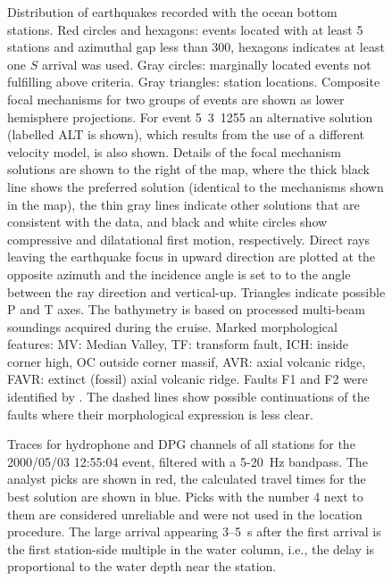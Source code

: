 \documentclass[jgr]{aguplus}
\newlength{\tw}
\begin{document}
\clearpage

\begin{figure}

\caption{Distribution of earthquakes recorded with the ocean bottom
stations.  Red circles and hexagons: events located with at least 5 stations and
azimuthal gap less than 300\dg, hexagons indicates at least one $S$
arrival was used. Gray circles: marginally located events not fulfilling above
criteria. Gray triangles: station locations.  Composite focal mechanisms for two
groups of events are shown as lower hemisphere projections.
  For
event 5~3~1255 an alternative solution (labelled ALT is shown), which results from
the use of a different velocity model, is also shown.  Details of the focal
mechanism solutions are shown to the right of the map, where the thick
black line shows the preferred solution (identical to the
mechanisms shown in the map), the thin gray lines indicate other
solutions that are consistent with the data, and black and white circles show
compressive and dilatational first motion, respectively. Direct rays
leaving the earthquake focus in upward direction are plotted at the
opposite azimuth and the incidence angle is set to to the angle
between the ray direction and vertical-up.  Triangles indicate possible P and T axes.  The bathymetry is
based on processed multi-beam soundings acquired during the cruise.
Marked morphological features: MV: Median Valley, TF: transform fault,
ICH: inside corner high, OC outside corner massif, AVR: axial volcanic
ridge, FAVR: extinct (fossil) axial volcanic ridge. Faults F1 and F2 were identified by \citep{reston02}.
The dashed lines show possible continuations of the faults where their morphological expression is
less clear.}
\label{fig:seismag-map}
\end{figure}

\clearpage

\begin{figure}
\caption{Traces for hydrophone and DPG channels of all stations for the
2000/05/03 12:55:04 event, filtered with a 5-20~Hz bandpass.  The
analyst picks are shown in red, the calculated travel times for the
best solution are shown in blue.  Picks with the number 4 next to them
are considered unreliable and were not used in the location
procedure.  The large arrival appearing 3--5~s after the first arrival
is the first station-side multiple in the water column, i.e., the
delay is proportional to the water depth near the station.}
\label{fig:data-example}
\end{figure}
\end{document}
